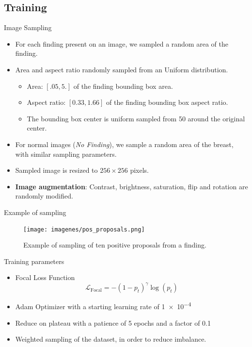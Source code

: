 \subsection{Training}
\begin{frame}{Image Sampling}
    \begin{itemize}
        \item For each finding present on an image, we sampled a random area of the finding.
        \item Area and aspect ratio randomly sampled from an Uniform distribution.
        \begin{itemize}
            \item Area: $[.05, 5.]$ of the finding bounding box area.
            \item Aspect ratio: $[0.33, 1.66]$ of the finding bounding box aspect ratio.
            \item The bounding box center is uniform sampled from \SI{50}{\pixel} around the original center.
        \end{itemize}
        \item For normal images (\emph{No Finding}), we sample a random area of the breast, with similar sampling parameters.
        \item Sampled image is resized to $256 \times 256$ pixels.
        \item \textbf{Image augmentation}: Contrast, brightness, saturation, flip and rotation are randomly modified.
    \end{itemize}
\end{frame}

\begin{frame}{Example of sampling}
    \begin{figure}
        \centering
        \texttt{[image: imagenes/pos\_proposals.png]}
        \caption{Example of sampling of ten positive proposals from a finding.}
    \end{figure}
\end{frame}

\begin{frame}{Training parameters}
    \begin{itemize}
        \item Focal Loss Function \begin{equation*}
            \mathcal{L}_{\text{Focal}} = -(1 - p_t)^\gamma \log{(p_t)}
        \end{equation*}
        \item Adam Optimizer with a starting learning rate of \num{1e-4}
        \item Reduce on plateau with a patience of 5 epochs and a factor of \num{0.1}
        \item Weighted sampling of the dataset, in order to reduce imbalance.
    \end{itemize}
\end{frame}

